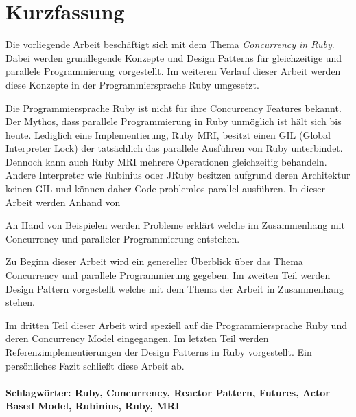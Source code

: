 \section*{Kurzfassung}
\vspace{0.5cm}

Die vorliegende Arbeit beschäftigt sich mit dem Thema \emph{Concurrency in Ruby}. Dabei werden grundlegende Konzepte und Design Patterns für gleichzeitige und parallele Programmierung vorgestellt. Im weiteren Verlauf dieser Arbeit werden diese Konzepte in der Programmiersprache Ruby umgesetzt. 

Die Programmiersprache Ruby ist nicht für ihre Concurrency Features bekannt. Der Mythos, dass parallele Programmierung in Ruby unmöglich ist hält sich bis heute. Lediglich eine Implementierung, Ruby MRI, besitzt einen GIL (Global Interpreter Lock) der tatsächlich das parallele Ausführen von Ruby unterbindet. Dennoch kann auch Ruby MRI mehrere Operationen gleichzeitig behandeln. Andere Interpreter wie Rubinius oder JRuby besitzen aufgrund deren Architektur keinen GIL und können daher Code problemlos parallel ausführen. In dieser Arbeit werden Anhand von 

An Hand von Beispielen werden Probleme erklärt welche im Zusammenhang mit Concurrency und paralleler Programmierung entstehen. 

Zu Beginn dieser Arbeit wird ein genereller Überblick über das Thema Concurrency und parallele Programmierung  gegeben. Im zweiten Teil werden Design Pattern vorgestellt welche mit dem Thema der Arbeit in Zusammenhang stehen. 

Im dritten Teil dieser Arbeit wird speziell auf die Programmiersprache Ruby und deren Concurrency Model eingegangen. Im letzten Teil werden Referenzimplementierungen der Design Patterns in Ruby vorgestellt. Ein persönliches Fazit schließt diese Arbeit ab.

\paragraph{Schlagwörter: Ruby, Concurrency, Reactor Pattern, Futures, Actor Based Model, Rubinius, Ruby, MRI}